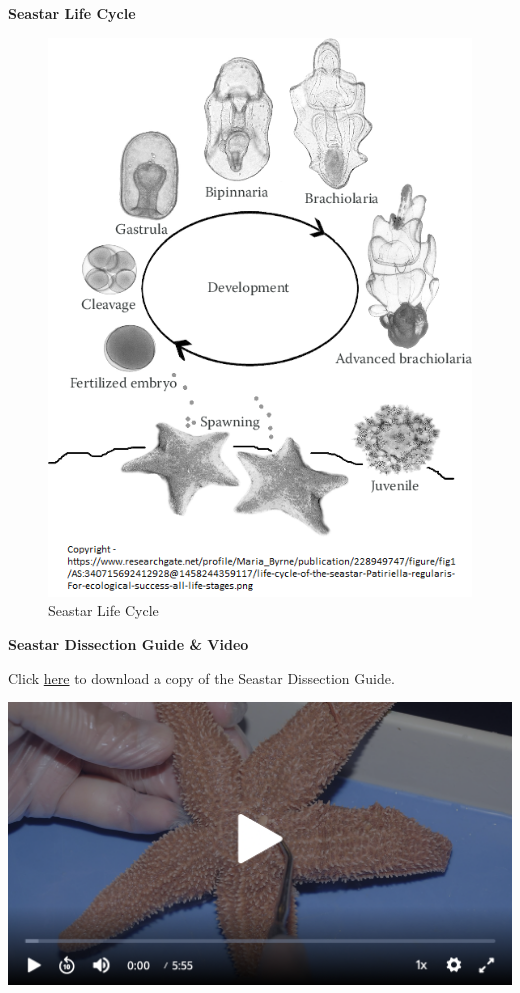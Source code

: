 \documentclass[
]{book}
\begin{document}
\textbf{Seastar Life Cycle}

\begin{figure}
\centering
\includegraphics{images/Lab6_seastar_life_cycle.png}
\caption{Seastar Life Cycle}
\end{figure}

\textbf{Seastar Dissection Guide \& Video}

Click \href{files/Lab6_seastar_dissection_guide.pdf}{here} to download a copy of the Seastar Dissection Guide.

\includegraphics{images/Lab6_Seastar_Dissection_Video1.png}
\end{document}
